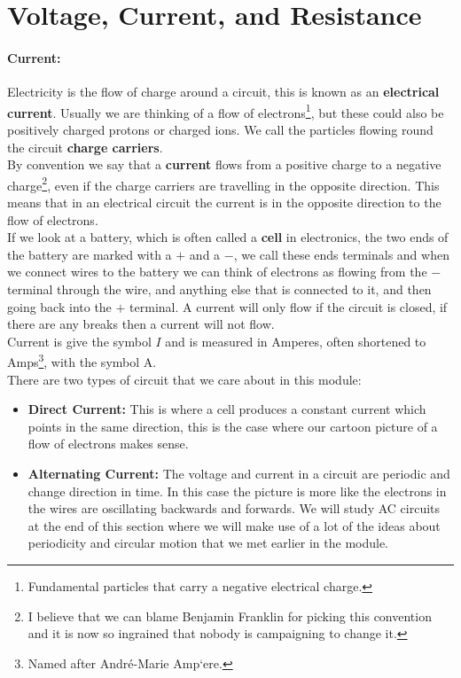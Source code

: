 \documentclass[a4paper,12pt]{book}
\begin{document}
\section{Voltage, Current, and Resistance}
\paragraph{Current:} Electricity is the flow of charge around a circuit, this is known as an \textbf{electrical current}. Usually we are thinking of a flow of electrons\footnote{Fundamental particles that carry a negative electrical charge.}, but these could also be positively charged protons or charged ions. We call the particles flowing round the circuit \textbf{charge carriers}.\\

By convention we say that a \textbf{current} flows from a positive charge to a negative charge\footnote{I believe that we can blame Benjamin Franklin for picking this convention and it is now so ingrained that nobody is campaigning to change it.}, even if the charge carriers are travelling in the opposite direction. This means that in an electrical circuit the current is in the opposite direction to the flow of electrons.\\

If we look at a battery, which is often called a \textbf{cell} in electronics, the two ends of the battery are marked with a $+$ and a $-$, we call these ends terminals and when we connect wires to the battery we can think of electrons as flowing from the $-$ terminal through the wire, and anything else that is connected to it, and then going back into the $+$ terminal. A current will only flow if  the circuit is closed, if there are any breaks then a current will not flow.\\

Current is give the symbol $I$ and is measured in Amperes, often shortened to Amps\footnote{Named after Andr\'{e}-Marie Amp`{e}re.}, with the symbol $\text{A}$.\\

There are two types of circuit that we care about in this module:
\begin{itemize}
\setlength{\itemsep}{-5pt}
    \item \textbf{Direct Current:} This is where a cell produces a constant current which points in the same direction, this is the case where our cartoon picture of a flow of electrons makes sense.
    \item \textbf{Alternating Current:} The voltage and current in a circuit are periodic and change direction in time. In this case the picture is more like the electrons in the wires are oscillating backwards and forwards. We will study AC circuits at the end of this section where we will make use of a lot of the ideas about periodicity and circular motion that we met earlier in the module.
\end{itemize}  
\end{document}
